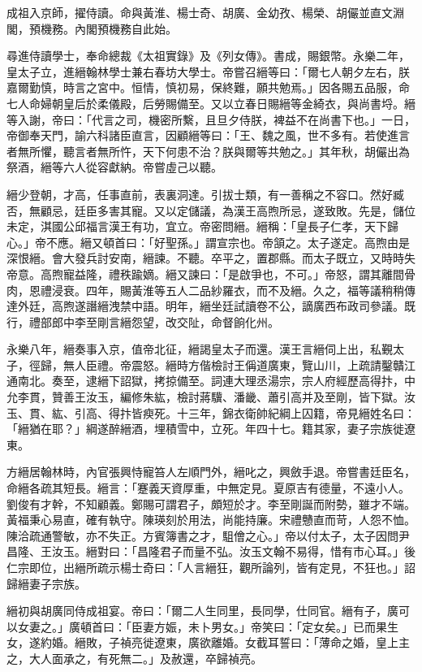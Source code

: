 \begin{pinyinscope}
成祖入京師，擢侍讀。命與黃淮、楊士奇、胡廣、金幼孜、楊榮、胡儼並直文淵閣，預機務。內閣預機務自此始。

尋進侍讀學士，奉命總裁《太祖實錄》及《列女傳》。書成，賜銀幣。永樂二年，皇太子立，進縉翰林學士兼右春坊大學士。帝嘗召縉等曰：「爾七人朝夕左右，朕嘉爾勤慎，時言之宮中。恒情，慎初易，保終難，願共勉焉。」因各賜五品服，命七人命婦朝皇后於柔儀殿，后勞賜備至。又以立春日賜縉等金綺衣，與尚書埒。縉等入謝，帝曰：「代言之司，機密所繫，且旦夕侍朕，裨益不在尚書下也。」一日，帝御奉天門，諭六科諸臣直言，因顧縉等曰：「王、魏之風，世不多有。若使進言者無所懼，聽言者無所忤，天下何患不治？朕與爾等共勉之。」其年秋，胡儼出為祭酒，縉等六人從容獻納。帝嘗虛己以聽。

縉少登朝，才高，任事直前，表裏洞達。引拔士類，有一善稱之不容口。然好臧否，無顧忌，廷臣多害其寵。又以定儲議，為漢王高煦所忌，遂致敗。先是，儲位未定，淇國公邱福言漢王有功，宜立。帝密問縉。縉稱：「皇長子仁孝，天下歸心。」帝不應。縉又頓首曰：「好聖孫。」謂宣宗也。帝頷之。太子遂定。高煦由是深恨縉。會大發兵討安南，縉諫。不聽。卒平之，置郡縣。而太子既立，又時時失帝意。高煦寵益隆，禮秩踰嫡。縉又諫曰：「是啟爭也，不可。」帝怒，謂其離間骨肉，恩禮浸衰。四年，賜黃淮等五人二品紗羅衣，而不及縉。久之，福等議稍稍傳達外廷，高煦遂譖縉洩禁中語。明年，縉坐廷試讀卷不公，謫廣西布政司參議。既行，禮部郎中李至剛言縉怨望，改交阯，命督餉化州。

永樂八年，縉奏事入京，值帝北征，縉謁皇太子而還。漢王言縉伺上出，私覲太子，徑歸，無人臣禮。帝震怒。縉時方偕檢討王偁道廣東，覽山川，上疏請鑿贛江通南北。奏至，逮縉下詔獄，拷掠備至。詞連大理丞湯宗，宗人府經歷高得抃，中允李貫，贊善王汝玉，編修朱紘，檢討蔣驥、潘畿、蕭引高并及至剛，皆下獄。汝玉、貫、紘、引高、得抃皆瘐死。十三年，錦衣衛帥紀綱上囚籍，帝見縉姓名曰：「縉猶在耶？」綱遂醉縉酒，埋積雪中，立死。年四十七。籍其家，妻子宗族徙遼東。

方縉居翰林時，內官張興恃寵笞人左順門外，縉叱之，興斂手退。帝嘗書廷臣名，命縉各疏其短長。縉言：「蹇義天資厚重，中無定見。夏原吉有德量，不遠小人。劉俊有才幹，不知顧義。鄭賜可謂君子，頗短於才。李至剛誕而附勢，雖才不端。黃福秉心易直，確有執守。陳瑛刻於用法，尚能持廉。宋禮戇直而苛，人怨不恤。陳洽疏通警敏，亦不失正。方賓簿書之才，駔儈之心。」帝以付太子，太子因問尹昌隆、王汝玉。縉對曰：「昌隆君子而量不弘。汝玉文翰不易得，惜有市心耳。」後仁宗即位，出縉所疏示楊士奇曰：「人言縉狂，觀所論列，皆有定見，不狂也。」詔歸縉妻子宗族。

縉初與胡廣同侍成祖宴。帝曰：「爾二人生同里，長同學，仕同官。縉有子，廣可以女妻之。」廣頓首曰：「臣妻方娠，未卜男女。」帝笑曰：「定女矣。」已而果生女，遂約婚。縉敗，子禎亮徙遼東，廣欲離婚。女截耳誓曰：「薄命之婚，皇上主之，大人面承之，有死無二。」及赦還，卒歸禎亮。


\end{pinyinscope}
